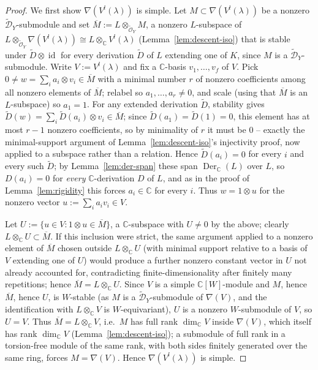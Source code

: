\documentclass[11pt,a4paper]{article}
\begin{document}
\begin{proof}
We first show $\nabla(V^l(\lambda))$ is simple. Let $M \subset \nabla(V^l(\lambda))$
be a nonzero $\widetilde{\mathcal{D}}_Y$-submodule and set
$\overline M := L \otimes_{\widetilde{\mathcal{O}}_Y} M$, a nonzero
$L$-subspace of
$L \otimes_{\widetilde{\mathcal{O}}_Y} \nabla(V^l(\lambda)) \cong L \otimes_{\mathbb{C}} V^l(\lambda)$
(Lemma~\ref{lem:descent-iso}) that is stable under
$\widetilde D \otimes \operatorname{id}$ for every derivation
$\widetilde D$ of $L$ extending one of $K$, since $M$ is a
$\widetilde{\mathcal{D}}_Y$-submodule. Write $V := V^l(\lambda)$ and
fix a $\mathbb{C}$-basis $v_1,\dots,v_f$ of $V$. Pick
$0 \ne w = \sum_i a_i \otimes v_i \in \overline M$ with a minimal
number $r$ of nonzero coefficients among all nonzero elements of
$\overline M$; relabel so $a_1,\dots,a_r \ne 0$, and scale (using that
$\overline M$ is an $L$-subspace) so $a_1 = 1$. For any extended
derivation $\widetilde D$, stability gives
$\widetilde D(w) = \sum_i \widetilde D(a_i) \otimes v_i \in \overline M$;
since $\widetilde D(a_1) = \widetilde D(1) = 0$, this element has at
most $r-1$ nonzero coefficients, so by minimality of $r$ it must be
$0$ -- exactly the minimal-support argument of
Lemma~\ref{lem:descent-iso}'s injectivity proof, now applied to a
subspace rather than a relation. Hence $\widetilde D(a_i) = 0$ for
every $i$ and every such $\widetilde D$; by Lemma~\ref{lem:der-span}
these span $\operatorname{Der}_{\mathbb{C}}(L)$ over $L$, so
$D(a_i) = 0$ for \emph{every} $\mathbb{C}$-derivation $D$ of $L$, and
as in the proof of Lemma~\ref{lem:rigidity} this forces $a_i \in \mathbb{C}$
for every $i$. Thus $w = 1 \otimes u$ for the nonzero vector
$u := \sum_i a_i v_i \in V$.

Let $U := \{u \in V : 1 \otimes u \in \overline M\}$, a
$\mathbb{C}$-subspace with $U \ne 0$ by the above; clearly
$L \otimes_{\mathbb{C}} U \subset \overline M$. If this inclusion were
strict, the same argument applied to a nonzero element of
$\overline M$ chosen outside $L \otimes_{\mathbb{C}} U$ (with minimal
support relative to a basis of $V$ extending one of $U$) would
produce a further nonzero constant vector in $U$ not already
accounted for, contradicting finite-dimensionality after finitely
many repetitions; hence $\overline M = L \otimes_{\mathbb{C}} U$.
Since $V$ is a simple $\mathbb{C}[W]$-module and $M$, hence
$\overline M$, hence $U$, is $W$-stable (as $M$ is a
$\widetilde{\mathcal{D}}_Y$-submodule of $\nabla(V)$, and the
identification with $L\otimes_{\mathbb C}V$ is $W$-equivariant), $U$
is a nonzero $W$-submodule of $V$, so $U = V$. Thus
$\overline M = L \otimes_{\mathbb{C}} V$, i.e.\ $M$ has full rank
$\dim_{\mathbb{C}} V$ inside $\nabla(V)$, which itself has rank
$\dim_{\mathbb{C}} V$ (Lemma~\ref{lem:descent-iso}); a submodule of
full rank in a torsion-free module of the same rank, with both sides
finitely generated over the same ring, forces $M = \nabla(V)$.
Hence $\nabla(V^l(\lambda))$ is simple.


\end{proof}
\end{document}
